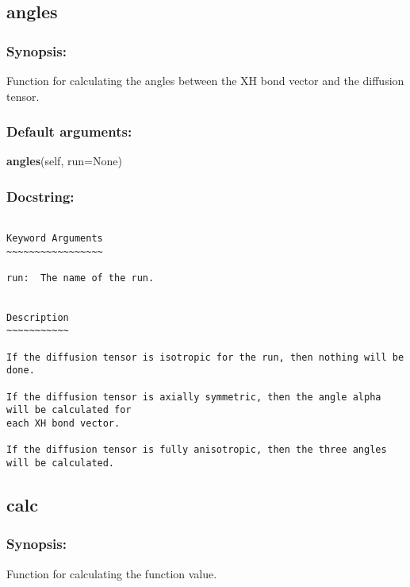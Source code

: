 

\newpage

\subsection{angles}


\subsubsection{Synopsis:}

Function for calculating the angles between the XH bond vector and the diffusion tensor.

\subsubsection{Default arguments:}

\textsf{\textbf{angles}(self, run=None)
}


\subsubsection{Docstring:}

{\scriptsize
\begin{verbatim}

Keyword Arguments
~~~~~~~~~~~~~~~~~

run:  The name of the run.


Description
~~~~~~~~~~~

If the diffusion tensor is isotropic for the run, then nothing will be done.

If the diffusion tensor is axially symmetric, then the angle alpha will be calculated for
each XH bond vector.

If the diffusion tensor is fully anisotropic, then the three angles will be calculated.
\end{verbatim}
}



\newpage

\subsection{calc}


\subsubsection{Synopsis:}

Function for calculating the function value.

